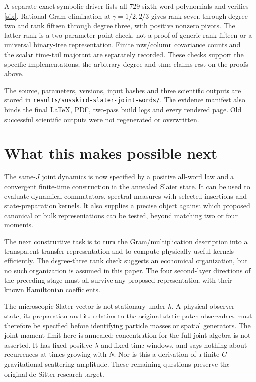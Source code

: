\documentclass[11pt]{article}
\begin{document}
A separate exact symbolic driver lists all 729 sixth-word
polynomials and verifies \eqref{six}. Rational Gram elimination
at $\gamma=1/2,2/3$ gives rank seven through degree two and rank
fifteen through degree three, with positive nonzero pivots.
The latter rank is a two-parameter-point check, not a proof of
generic rank fifteen or a universal binary-tree representation.
Finite row/column covariance counts and the scalar time-tail
majorant are separately recorded. These checks support the
specific implementations; the arbitrary-degree and time claims
rest on the proofs above.

The source, parameters, versions, input hashes and three scientific
outputs are stored in
\texttt{results/susskind-slater-joint-words/}.
The evidence manifest also binds the final LaTeX, PDF, two-pass
build logs and every rendered page. Old successful scientific
outputs were not regenerated or overwritten.

\newpage
\section{What this makes possible next}
The same-$J$ joint dynamics is now specified by a positive
all-word law and a convergent finite-time construction in the
annealed Slater state. It can be used to evaluate dynamical
commutators, spectral measures with selected insertions and
state-preparation kernels. It also supplies a precise object
against which proposed canonical or bulk representations can be
tested, beyond matching two or four moments.

The next constructive task is to turn the Gram/multiplication
description into a transparent transfer representation and to
compute physically useful kernels efficiently. The degree-three
rank check suggests an economical organization, but no such
organization is assumed in this paper. The four second-layer
directions of the preceding stage must all survive any proposed
representation with their known Hamiltonian coefficients.

The microscopic Slater vector is not stationary under $h$.
A physical observer state, its preparation and its relation to
the original static-patch observables must therefore be specified
before identifying particle masses or spatial generators. The
joint moment limit here is annealed; concentration for the full
joint algebra is not asserted. It has fixed positive $\lambda$
and fixed time windows, and says nothing about recurrences at
times growing with $N$. Nor is this a derivation of a finite-$G$
gravitational scattering amplitude. These remaining questions
preserve the original de Sitter research target.
\end{document}
